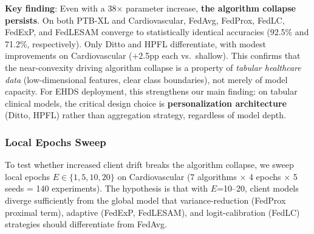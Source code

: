 \documentclass[conference]{IEEEtran}
\begin{document}
\textbf{Key finding}: Even with a 38$\times$ parameter increase, \textbf{the algorithm collapse persists}. On both PTB-XL and Cardiovascular, FedAvg, FedProx, FedLC, FedExP, and FedLESAM converge to statistically identical accuracies (92.5\% and 71.2\%, respectively). Only Ditto and HPFL differentiate, with modest improvements on Cardiovascular (+2.5pp each vs.\ shallow). This confirms that the near-convexity driving algorithm collapse is a property of \textit{tabular healthcare data} (low-dimensional features, clear class boundaries), not merely of model capacity. For EHDS deployment, this strengthens our main finding: on tabular clinical models, the critical design choice is \textbf{personalization architecture} (Ditto, HPFL) rather than aggregation strategy, regardless of model depth.

\subsubsection{Local Epochs Sweep}
\label{sec:epochs_sweep}

To test whether increased client drift breaks the algorithm collapse, we sweep local epochs $E \in \{1, 5, 10, 20\}$ on Cardiovascular (7 algorithms $\times$ 4 epochs $\times$ 5 seeds = 140 experiments). The hypothesis is that with $E$=10--20, client models diverge sufficiently from the global model that variance-reduction (FedProx proximal term), adaptive (FedExP, FedLESAM), and logit-calibration (FedLC) strategies should differentiate from FedAvg.
\end{document}
